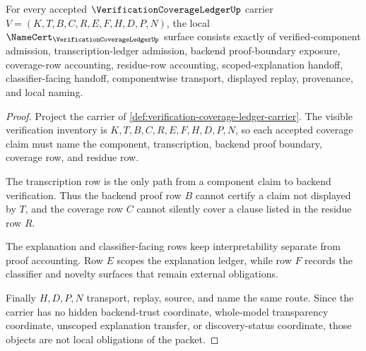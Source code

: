 \begin{theorem}
\label{thm:verification-coverage-ledger-namecert-obligations}
For every accepted $\VerificationCoverageLedgerUp$ carrier $V=(K,T,B,C,R,E,F,H,D,P,N)$, the local $\NameCert_{\VerificationCoverageLedgerUp}$ surface consists exactly of verified-component admission, transcription-ledger admission, backend proof-boundary exposure, coverage-row accounting, residue-row accounting, scoped-explanation handoff, classifier-facing handoff, componentwise transport, displayed replay, provenance, and local naming.
\end{theorem}
\begin{proof}
Project the carrier of \autoref{def:verification-coverage-ledger-carrier}. The visible verification inventory is $K,T,B,C,R,E,F,H,D,P,N$, so each accepted coverage claim must name the component, transcription, backend proof boundary, coverage row, and residue row.

The transcription row is the only path from a component claim to backend verification. Thus the backend proof row $B$ cannot certify a claim not displayed by $T$, and the coverage row $C$ cannot silently cover a clause listed in the residue row $R$.

The explanation and classifier-facing rows keep interpretability separate from proof accounting. Row $E$ scopes the explanation ledger, while row $F$ records the classifier and novelty surfaces that remain external obligations.

Finally $H,D,P,N$ transport, replay, source, and name the same route. Since the carrier has no hidden backend-trust coordinate, whole-model transparency coordinate, unscoped explanation transfer, or discovery-status coordinate, those objects are not local obligations of the packet.
\end{proof}

